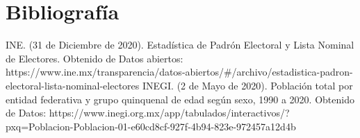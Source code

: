 \documentclass{article}
\begin{document}
\printbibliography

\section*{Bibliografía}
INE. (31 de Diciembre de 2020). Estadística de Padrón Electoral y Lista Nominal de Electores. Obtenido de Datos abiertos: https://www.ine.mx/transparencia/datos-abiertos/#/archivo/estadistica-padron-electoral-lista-nominal-electores\newline\newline
INEGI. (2 de Mayo de 2020). Población total por entidad federativa y grupo quinquenal de edad según sexo, 1990 a 2020. Obtenido de Datos: https://www.inegi.org.mx/app/tabulados/interactivos/?pxq=Poblacion-Poblacion-01-e60cd8cf-927f-4b94-823e-972457a12d4b
\end{document}
